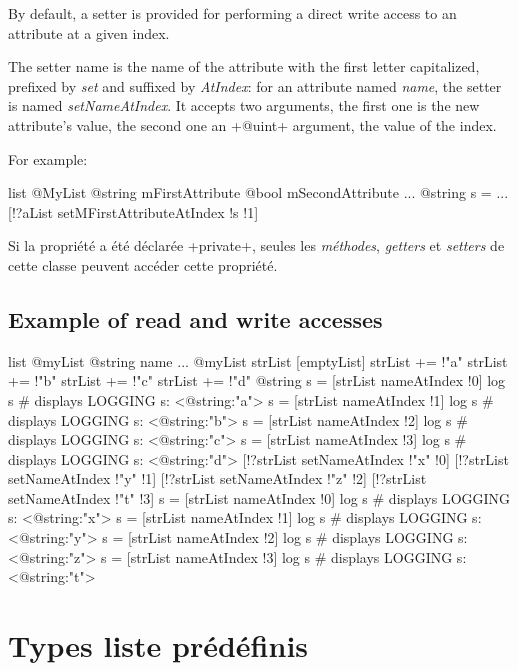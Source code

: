 By default, a setter is provided for performing a direct write access to an attribute at a given index.

The setter name is the name of the attribute with the first letter capitalized, prefixed by \emph{set} and suffixed by \emph{AtIndex}: for an attribute named \emph{name}, the setter is named \emph{setNameAtIndex}. It accepts two arguments, the first one is the new attribute's value, the second one an \ggs+@uint+ argument, the value of the index.

For example:

\begin{galgas}
list @MyList {
  @string mFirstAttribute
  @bool mSecondAttribute
}
...
@string s = ...
[!?aList setMFirstAttributeAtIndex !s !1]
\end{galgas}

Si la propriété a été déclarée \ggs+private+, seules les \emph{méthodes}, \emph{getters} et \emph{setters} de cette classe peuvent accéder cette propriété.


\subsection{Example of read and write accesses}

\begin{galgas}
list @myList {
  @string name
}
...
@myList strList [emptyList]
strList += !"a"
strList += !"b"
strList += !"c"
strList += !"d"
@string s = [strList nameAtIndex !0]
log s # displays LOGGING s: <@string:"a">
s = [strList nameAtIndex !1]
log s # displays LOGGING s: <@string:"b">
s = [strList nameAtIndex !2]
log s # displays LOGGING s: <@string:"c">
s = [strList nameAtIndex !3]
log s # displays LOGGING s: <@string:"d">
[!?strList setNameAtIndex !"x" !0]
[!?strList setNameAtIndex !"y" !1]
[!?strList setNameAtIndex !"z" !2]
[!?strList setNameAtIndex !"t" !3]
s = [strList nameAtIndex !0]
log s # displays LOGGING s: <@string:"x">
s = [strList nameAtIndex !1]
log s # displays LOGGING s: <@string:"y">
s = [strList nameAtIndex !2]
log s # displays LOGGING s: <@string:"z">
s = [strList nameAtIndex !3]
log s # displays LOGGING s: <@string:"t">
\end{galgas}


\section{Types liste prédéfinis}


